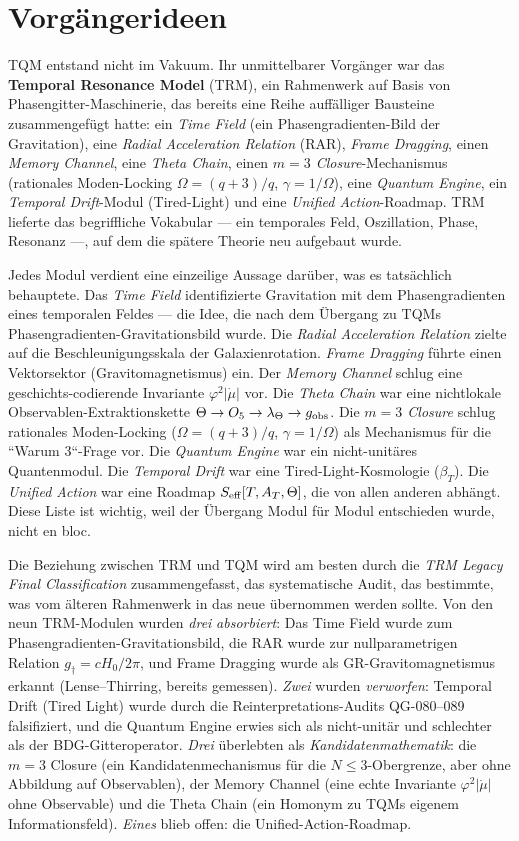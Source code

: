 \documentclass[10pt,twoside,openany]{book}
\begin{document}
\section{Vorgängerideen}

TQM entstand nicht im Vakuum. Ihr unmittelbarer Vorgänger war das \textbf{Temporal
Resonance Model} (TRM), ein Rahmenwerk auf Basis von Phasengitter-Maschinerie, das bereits
eine Reihe auffälliger Bausteine zusammengefügt hatte: ein \emph{Time Field} (ein
Phasengradienten-Bild der Gravitation), eine \emph{Radial Acceleration Relation} (RAR),
\emph{Frame Dragging}, einen \emph{Memory Channel}, eine \emph{Theta Chain}, einen
\emph{$m=3$ Closure}-Mechanismus (rationales Moden-Locking $\Omega=(q+3)/q$,
$\gamma=1/\Omega$), eine \emph{Quantum Engine}, ein \emph{Temporal Drift}-Modul
(Tired-Light) und eine \emph{Unified Action}-Roadmap. TRM lieferte das begriffliche
Vokabular --- ein temporales Feld, Oszillation, Phase, Resonanz ---, auf dem die spätere
Theorie neu aufgebaut wurde.

Jedes Modul verdient eine einzeilige Aussage darüber, was es tatsächlich behauptete. Das
\emph{Time Field} identifizierte Gravitation mit dem Phasengradienten eines temporalen
Feldes --- die Idee, die nach dem Übergang zu TQMs Phasengradienten-Gravitationsbild wurde.
Die \emph{Radial Acceleration Relation} zielte auf die Beschleunigungsskala der
Galaxienrotation. \emph{Frame Dragging} führte einen Vektorsektor (Gravitomagnetismus) ein.
Der \emph{Memory Channel} schlug eine geschichts-codierende Invariante $\varphi^2|\dot\mu|$
vor. Die \emph{Theta Chain} war eine nichtlokale Observablen-Extraktionskette
$\Theta\to O_5\to\lambda_\Theta\to g_{\rm obs}$. Die \emph{$m=3$ Closure} schlug rationales
Moden-Locking ($\Omega=(q+3)/q$, $\gamma=1/\Omega$) als Mechanismus für die ``Warum 3``-Frage
vor. Die \emph{Quantum Engine} war ein nicht-unitäres Quantenmodul. Die \emph{Temporal
Drift} war eine Tired-Light-Kosmologie ($\beta_T$). Die \emph{Unified Action} war eine
Roadmap $S_{\rm eff}[T,A_T,\Theta]$, die von allen anderen abhängt. Diese Liste ist
wichtig, weil der Übergang Modul für Modul entschieden wurde, nicht en bloc.

Die Beziehung zwischen TRM und TQM wird am besten durch die \emph{TRM Legacy Final
Classification} zusammengefasst, das systematische Audit, das bestimmte, was vom älteren
Rahmenwerk in das neue übernommen werden sollte. Von den neun TRM-Modulen wurden
\emph{drei} \emph{absorbiert}: Das Time Field wurde zum Phasengradienten-Gravitationsbild,
die RAR wurde zur nullparametrigen Relation $g_\dagger = cH_0/2\pi$, und Frame Dragging
wurde als GR-Gravitomagnetismus erkannt (Lense--Thirring, bereits gemessen). \emph{Zwei}
wurden \emph{verworfen}: Temporal Drift (Tired Light) wurde durch die
Reinterpretations-Audits QG-080--089 falsifiziert, und die Quantum Engine erwies sich als
nicht-unitär und schlechter als der BDG-Gitteroperator. \emph{Drei} überlebten als
\emph{Kandidatenmathematik}: die $m=3$ Closure (ein Kandidatenmechanismus für die
$N\le3$-Obergrenze, aber ohne Abbildung auf Observablen), der Memory Channel (eine echte
Invariante $\varphi^2|\dot\mu|$ ohne Observable) und die Theta Chain (ein Homonym zu TQMs
eigenem Informationsfeld). \emph{Eines} blieb offen: die Unified-Action-Roadmap.
\end{document}
